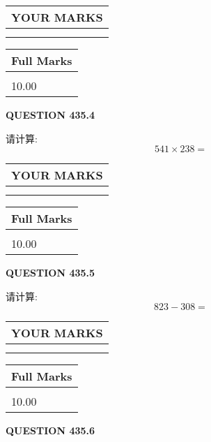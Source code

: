 \documentclass{ctexart}
\begin{document}
\noindent\begin{tabular}{|l|}
\hline
 YOUR MARKS  \\
\hline
 \\ 
 \\ 
\hline
\end{tabular}
\hspace{0.05in} \begin{tabular}{|l|}
\hline
 Full Marks  \\
\hline
 \\ 
10.00 \\
\hline
\end{tabular}
{\textbf{\Large{QUESTION
435.4 
}}}
  
  
 
请计算:
\begin{equation}
541  \times    %
238 = \nonumber
\end{equation}
 

 

 
  
\vspace{0.2in}
  
\noindent\begin{tabular}{|l|}
\hline
 YOUR MARKS  \\
\hline
 \\ 
 \\ 
\hline
\end{tabular}
\hspace{0.05in} \begin{tabular}{|l|}
\hline
 Full Marks  \\
\hline
 \\ 
10.00 \\
\hline
\end{tabular}
{\textbf{\Large{QUESTION
435.5 
}}}
  
  
 
请计算:
\begin{equation}
823 -   %
308 = \nonumber
\end{equation}
 

 

 
  
\vspace{0.2in}
  
\noindent\begin{tabular}{|l|}
\hline
 YOUR MARKS  \\
\hline
 \\ 
 \\ 
\hline
\end{tabular}
\hspace{0.05in} \begin{tabular}{|l|}
\hline
 Full Marks  \\
\hline
 \\ 
10.00 \\
\hline
\end{tabular}
{\textbf{\Large{QUESTION
435.6 
}}}
  
\end{document}

